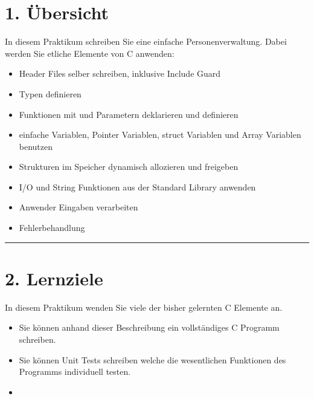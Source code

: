 \documentclass[a4paper,10pt,english]{report}
\begin{document}
\section{1. Übersicht}
\label{\detokenize{P06_Personen_Verwaltung_Linked_List/README:ubersicht}}
\sphinxAtStartPar
In diesem Praktikum schreiben Sie eine einfache Personenverwaltung. Dabei werden Sie etliche Elemente von C anwenden:
\begin{itemize}
\item {} 
\sphinxAtStartPar
Header Files selber schreiben, inklusive Include Guard

\item {} 
\sphinxAtStartPar
Typen definieren

\item {} 
\sphinxAtStartPar
Funktionen mit  und  Parametern deklarieren und definieren

\item {} 
\sphinxAtStartPar
einfache Variablen, Pointer Variablen, struct Variablen und Array Variablen benutzen

\item {} 
\sphinxAtStartPar
Strukturen im Speicher dynamisch allozieren und freigeben

\item {} 
\sphinxAtStartPar
I/O und String Funktionen aus der Standard Library anwenden

\item {} 
\sphinxAtStartPar
Anwender Eingaben verarbeiten

\item {} 
\sphinxAtStartPar
Fehlerbehandlung

\end{itemize}


\bigskip\hrule\bigskip



\section{2. Lernziele}
\label{\detokenize{P06_Personen_Verwaltung_Linked_List/README:lernziele}}
\sphinxAtStartPar
In diesem Praktikum wenden Sie viele der bisher gelernten C Elemente an.
\begin{itemize}
\item {} 
\sphinxAtStartPar
Sie können anhand dieser Beschreibung ein vollständiges C Programm schreiben.

\item {} 
\sphinxAtStartPar
Sie können Unit Tests schreiben welche die wesentlichen Funktionen des Programms individuell testen.

\item {} 
\end{itemize}
\end{document}
